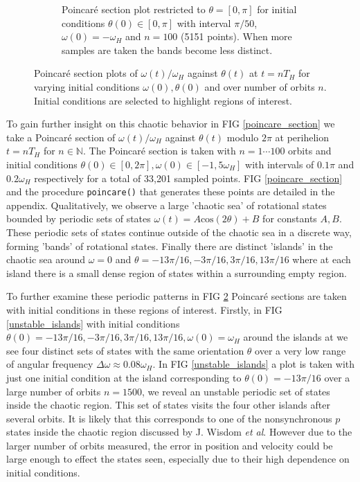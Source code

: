 \documentclass[10pt, twocolumn]{article} %
\begin{document}
\begin{figure}[th!]
\begin{subfigure}[t]{.45\textwidth}
    \caption{Poincar\'e section plot restricted to $\theta = [0, \pi]$ for initial conditions $\theta(0) \in [0, \pi]$ with interval $\pi/50$, $\omega(0) = -\omega_H$ and $n = 100$ (5151 points). When more samples are taken the bands become less distinct.}
    \label{poincare_bands_more_samples}
  \end{subfigure}
  \label{poincare_detail_graphs}
  \caption{Poincar\'e section plots of $\omega(t) / \omega_H$ against $\theta(t)$ at $t = nT_H$ for varying initial conditions $\omega(0), \theta(0)$ and over number of orbits $n$. Initial conditions are selected to highlight regions of interest.}
\end{figure}

To gain further insight on this chaotic behavior in FIG \ref{poincare_section} we take a Poincar\'e section of $\omega(t) / \omega_H$ against $\theta(t)$ modulo $2\pi$ at perihelion $t = nT_H$ for $n \in \mathbb{N}$. The Poincar\'e section is taken with $n = 1 \cdots 100$ orbits and initial conditions $\theta(0) \in [0, 2 \pi], \omega(0) \in [-1, 5 \omega_H]$ with intervals of $0.1 \pi$ and $0.2 \omega_H$ respectively for a total of 33,201 sampled points. FIG \ref{poincare_section} and the procedure \verb+poincare()+ that generates these points are detailed in the appendix. Qualitatively, we observe a large 'chaotic sea' of rotational states bounded by periodic sets of states $\omega(t) = A \mathrm{cos}(2\theta) + B$ for constants $A, B$. These periodic sets of states continue outside of the chaotic sea in a discrete way, forming 'bands' of rotational states. Finally there are distinct 'islands' in the chaotic sea around $\omega = 0$ and $\theta = -13\pi/16, -3\pi/16, 3\pi/16, 13\pi/16$ where at each island there is a small dense region of states within a surrounding empty region.

To further examine these periodic patterns in FIG \ref{poincare_detail_graphs} Poincar\'e sections are taken with initial conditions in these regions of interest. Firstly, in FIG \ref{unstable_islands} with initial conditions $\theta(0) = -13\pi/16, -3\pi/16, 3\pi/16, 13\pi/16, \omega(0) = \omega_H$ around the islands at we see four distinct sets of states with the same orientation $\theta$ over a very low range of angular frequency $\Delta\omega \approx 0.08\omega_H$. In FIG \ref{unstable_islands} a plot is taken with just one initial condition at the island corresponding to $\theta(0) = -13\pi/16$ over a large number of orbits $n = 1500$, we reveal an unstable periodic set of states inside the chaotic region. This set of states visits the four other islands after several orbits. It is likely that this corresponds to one of the nonsynchronous $p$ states inside the chaotic region discussed by J. Wisdom \textit{et al}. However due to the larger number of orbits measured, the error in position and velocity could be large enough to effect the states seen, especially due to their high dependence on initial conditions.
\end{document}
